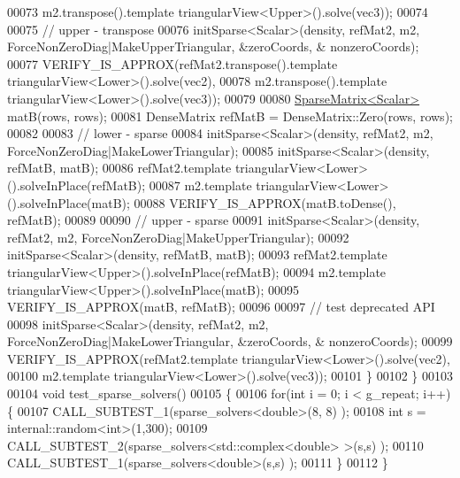 \begin{DoxyCode}
00073                      m2.transpose().template triangularView<Upper>().solve(vec3));
00074 
00075     \textcolor{comment}{// upper - transpose}
00076     initSparse<Scalar>(density, refMat2, m2, ForceNonZeroDiag|MakeUpperTriangular, &zeroCoords, &
      nonzeroCoords);
00077     VERIFY\_IS\_APPROX(refMat2.transpose().template triangularView<Lower>().solve(vec2),
00078                      m2.transpose().template triangularView<Lower>().solve(vec3));
00079 
00080     \hyperlink{group___sparse_core___module}{SparseMatrix<Scalar>} matB(rows, rows);
00081     DenseMatrix refMatB = DenseMatrix::Zero(rows, rows);
00082 
00083     \textcolor{comment}{// lower - sparse}
00084     initSparse<Scalar>(density, refMat2, m2, ForceNonZeroDiag|MakeLowerTriangular);
00085     initSparse<Scalar>(density, refMatB, matB);
00086     refMat2.template triangularView<Lower>().solveInPlace(refMatB);
00087     m2.template triangularView<Lower>().solveInPlace(matB);
00088     VERIFY\_IS\_APPROX(matB.toDense(), refMatB);
00089 
00090     \textcolor{comment}{// upper - sparse}
00091     initSparse<Scalar>(density, refMat2, m2, ForceNonZeroDiag|MakeUpperTriangular);
00092     initSparse<Scalar>(density, refMatB, matB);
00093     refMat2.template triangularView<Upper>().solveInPlace(refMatB);
00094     m2.template triangularView<Upper>().solveInPlace(matB);
00095     VERIFY\_IS\_APPROX(matB, refMatB);
00096 
00097     \textcolor{comment}{// test deprecated API}
00098     initSparse<Scalar>(density, refMat2, m2, ForceNonZeroDiag|MakeLowerTriangular, &zeroCoords, &
      nonzeroCoords);
00099     VERIFY\_IS\_APPROX(refMat2.template triangularView<Lower>().solve(vec2),
00100                      m2.template triangularView<Lower>().solve(vec3));
00101   \}
00102 \}
00103 
00104 \textcolor{keywordtype}{void} test\_sparse\_solvers()
00105 \{
00106   \textcolor{keywordflow}{for}(\textcolor{keywordtype}{int} i = 0; i < g\_repeat; i++) \{
00107     CALL\_SUBTEST\_1(sparse\_solvers<double>(8, 8) );
00108     \textcolor{keywordtype}{int} s = internal::random<int>(1,300);
00109     CALL\_SUBTEST\_2(sparse\_solvers<std::complex<double> >(s,s) );
00110     CALL\_SUBTEST\_1(sparse\_solvers<double>(s,s) );
00111   \}
00112 \}
\end{DoxyCode}
